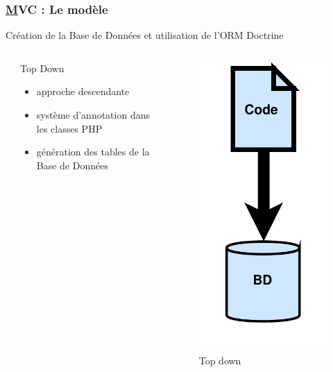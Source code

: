\begin{frame}
	\frametitle{\underline{M}VC : Le modèle}
	\begin{block}{Création de la Base de Données et utilisation de l'ORM Doctrine}	
		\begin{columns}
			\begin{column}{0.9cm}
			\end{column}
			\begin{column}{6cm}
				\begin{Large} Top Down\end{Large}
				\begin{itemize}
					\item approche descendante
					\item système d'annotation dans les classes PHP
					\item génération des tables de la Base de Données
				\end{itemize}
		\end{column}
		
		\begin{column}{4cm}
			\begin{figure}[!h]
				\begin{center}
					\includegraphics[scale=0.275]{images/topDown}
					\caption{Top down}
				\end{center}
			\end{figure}
		\end{column}
	

\end{columns}
\end{block}
\end{frame}
